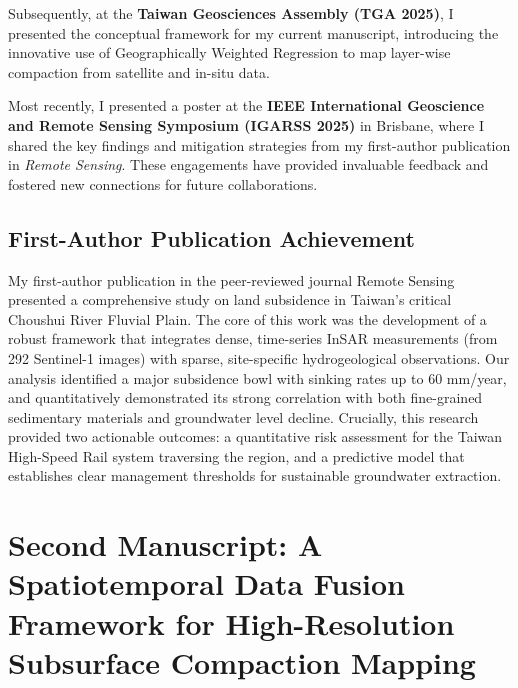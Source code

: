 \documentclass[12pt, a4paper]{article}
\begin{document}
	Subsequently, at the \textbf{Taiwan Geosciences Assembly (TGA 2025)}, I presented the conceptual framework for my current manuscript, introducing the innovative use of Geographically Weighted Regression to map layer-wise compaction from satellite and in-situ data. 
	
	Most recently, I presented a poster at the \textbf{IEEE International Geoscience and Remote Sensing Symposium (IGARSS 2025)} in Brisbane, where I shared the key findings and mitigation strategies from my first-author publication in \textit{Remote Sensing}. These engagements have provided invaluable feedback and fostered new connections for future collaborations.
	
	\subsection{First-Author Publication Achievement}
	
	My first-author publication in the peer-reviewed journal Remote Sensing presented a comprehensive study on land subsidence in Taiwan's critical Choushui River Fluvial Plain. The core of this work was the development of a robust framework that integrates dense, time-series InSAR measurements (from 292 Sentinel-1 images) with sparse, site-specific hydrogeological observations. Our analysis identified a major subsidence bowl with sinking rates up to 60 mm/year, and quantitatively demonstrated its strong correlation with both fine-grained sedimentary materials and groundwater level decline. Crucially, this research provided two actionable outcomes: a quantitative risk assessment for the Taiwan High-Speed Rail system traversing the region, and a predictive model that establishes clear management thresholds for sustainable groundwater extraction.
	

\section{Second Manuscript: A Spatiotemporal Data Fusion Framework for High-Resolution Subsurface Compaction Mapping}
\end{document}

